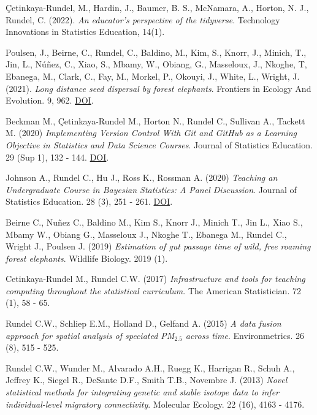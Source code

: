 \documentclass[margin,line]{res}
\begin{document}
\begin{resume}
\vspace{-0.15cm}
Çetinkaya-Rundel, M., Hardin, J., Baumer, B. S., McNamara, A., Horton, N. J., Rundel, C. (2022). {\em An educator's perspective of the tidyverse}. Technology Innovations in Statistics Education, 14(1).

\vspace{-0.15cm}
Poulsen, J., Beirne, C., Rundel, C., Baldino, M., Kim, S., Knorr, J., Minich, T., Jin, L.,  Núñez, C., Xiao, S., Mbamy, W., Obiang, G., Masseloux, J., Nkoghe, T, Ebanega, M., Clark, C., Fay, M., Morkel, P., Okouyi, J., White, L., Wright, J. (2021). {\em Long distance seed dispersal by forest elephants}. Frontiers in Ecology And Evolution. 9, 962. \href{https://doi.org/10.3389/fevo.2021.789264}{DOI}.

\vspace{-0.15cm}
Beckman M., Çetinkaya-Rundel M., Horton N., Rundel C., Sullivan A., Tackett M. (2020) {\em Implementing Version Control With Git and GitHub as a Learning Objective in Statistics and Data Science Courses}. Journal of Statistics Education. 29 (Sup 1), 132 - 144. \href{https://doi.org/10.1080/10691898.2020.1848485}{DOI}.

\vspace{-0.15cm}
Johnson A., Rundel C., Hu J., Ross K., Rossman A. (2020) {\em Teaching an Undergraduate Course in Bayesian Statistics: A Panel Discussion}. Journal of Statistics Education. 28 (3), 251 - 261. \href{https://doi.org/10.1080/10691898.2020.1845499}{DOI}.


\vspace{-0.15cm}
Beirne C., Nuñez C., Baldino M., Kim S., Knorr J., Minich T., Jin L., Xiao S., Mbamy W., Obiang G., Masseloux J., Nkoghe T., Ebanega M., Rundel C., Wright J., Poulsen J. (2019) {\em Estimation of gut passage time of wild, free roaming forest elephants}. Wildlife Biology. 2019 (1).

\vspace{-0.15cm}
Cetinkaya-Rundel M., Rundel C.W. (2017) {\em Infrastructure and tools for teaching computing throughout the statistical curriculum}. The American Statistician. 72 (1), 58 - 65.

\vspace{-0.15cm}
Rundel C.W., Schliep E.M., Holland D., Gelfand A. (2015) {\em A data fusion approach for spatial analysis of speciated PM$_{2.5}$ across time}. Environmetrics. 26 (8), 515 - 525.

\vspace{-0.15cm}
Rundel C.W., Wunder M., Alvarado A.H., Ruegg K., Harrigan R., Schuh A., Jeffrey K., Siegel R., DeSante D.F., Smith T.B., Novembre J. (2013) {\em Novel statistical methods for integrating genetic and stable isotope data to infer individual-level migratory connectivity}. Molecular Ecology. 22 (16), 4163 - 4176.


\end{resume}
\end{document}
